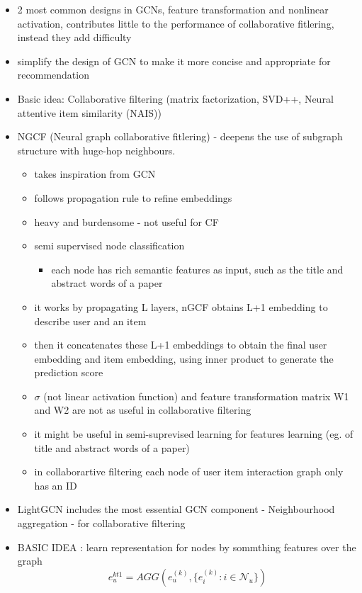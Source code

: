 \documentclass{report}
\begin{document}
\begin{itemize}
    \item 2 most common designs in GCNs, feature transformation and nonlinear activation, contributes little to the performance of collaborative fitlering, instead they add difficulty
    \item simplify the design of GCN to make it more concise and appropriate for recommendation 
    \item Basic idea: Collaborative filtering (matrix factorization, SVD++, Neural attentive item similarity (NAIS))
    \item NGCF (Neural graph collaborative fitlering) - deepens the use of subgraph structure with huge-hop neighbours. 
    \begin{itemize}
        \item takes inspiration from GCN
        \item follows propagation rule to refine embeddings
        \item heavy and burdensome - not useful for CF
        \item semi supervised node classification 
        \begin{itemize}
            \item each node has rich semantic features as input, such as the title and abstract words of a paper
        \end{itemize}
        \item it works by propagating L layers,  nGCF obtains L+1 embedding to describe  user and an item
        \item then it concatenates these L+1 embeddings to obtain the final user embedding and item embedding, using inner product to generate the prediction score
        \item \(\sigma\) (not linear activation function) and feature transformation matrix W1 and W2 are not as useful in collaborative filtering
        \item it might be useful in semi-suprevised learning for features learning (eg. of title and abstract words of a paper)
        \item in collaborartive filtering each node of user item interaction graph only has an ID
    \end{itemize}
    \item LightGCN includes the most essential GCN component - Neighbourhood aggregation - for collaborative filtering
    \item BASIC IDEA : learn representation for nodes by sommthing features over the graph $$ e_{u}^{kt1} = AGG(e_u^{(k)},\{e_i^{(k)}:i\in \mathcal{N}_u\})$$

\end{itemize}
\end{document}
